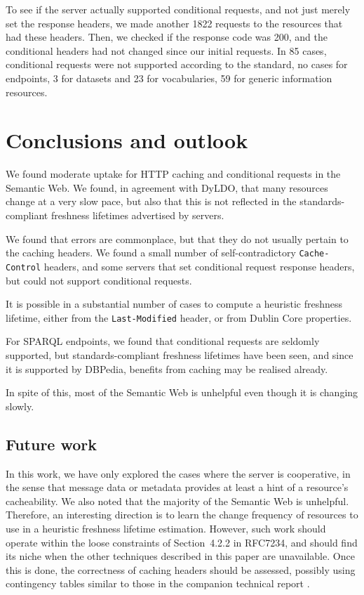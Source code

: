 \documentclass{llncs}
\newcommand{\httph}[1]{\texttt{#1}}
\begin{document}
To see if the server actually supported conditional requests, and not
just merely set the response headers, we made another 1822 requests to
the resources that had these headers. Then, we checked if the response
code was 200, and the conditional headers had not changed since our
initial requests. In 85 cases, conditional requests were not supported
according to the standard, no cases for endpoints, 3 for datasets and
23 for vocabularies, 59 for generic information resources.

\section{Conclusions and outlook}

We found moderate uptake for HTTP caching and conditional requests in
the Semantic Web. We found, in agreement with DyLDO\cite{dyldo2}, that
many resources change at a very slow pace, but also that this is not
reflected in the standards-compliant freshness lifetimes advertised by
servers.

We found that errors are commonplace, but that they do not usually
pertain to the caching headers. We found a small number of
self-contradictory \httph{Cache-Control} headers, and some servers
that set conditional request response headers, but could not support
conditional requests.

It is possible in a substantial number of cases to compute a heuristic
freshness lifetime, either from the \httph{Last-Modified} header, or
from Dublin Core properties. 

For SPARQL endpoints, we found that conditional requests are 
seldomly supported, but standards-compliant freshness lifetimes have
been seen, and since it is supported by DBPedia, benefits from caching
may be realised already.

In spite of this, most of the Semantic Web is unhelpful even though it
is changing slowly.

\subsection{Future work}

In this work, we have only explored the cases where the server is
cooperative, in the sense that message data or metadata provides at
least a hint of a resource's cacheability. We also noted that the
majority of the Semantic Web is unhelpful. Therefore, an interesting
direction is to learn the change frequency of resources to use in a
heuristic freshness lifetime estimation. However, such work should
operate within the loose constraints of Section~4.2.2 in RFC7234, and
should find its niche when the other techniques described in this paper
are unavailable. Once this is done, the correctness of caching headers
should be assessed, possibly using contingency tables similar to those
in the companion technical report \cite{kjernsmo_add_survey_2015}.
\end{document}
